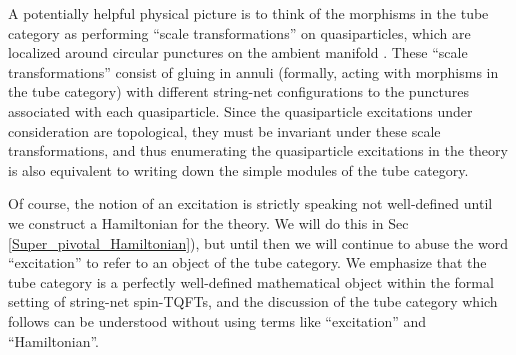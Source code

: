 \documentclass[12pt,a4paper]{article}
\newcommand{\mcc}{\mathcal{C}}
\newcommand{\ethan}[1]{{\color{amethyst}\footnotesize{(EL) #1}}}
\begin{document}
A potentially helpful physical picture is to think of the morphisms in the tube category as performing ``scale transformations'' 
on quasiparticles, which are localized around circular punctures on the ambient manifold \cite{lan2014}. 
These ``scale transformations'' consist of gluing in annuli (formally, acting with morphisms in the tube category) with different string-net configurations to the 
punctures associated with each quasiparticle. 
Since the quasiparticle excitations under consideration are topological, they must be invariant under these scale transformations, 
and thus enumerating the quasiparticle excitations in the theory is also equivalent to writing down the simple 
modules of the tube category. 

Of course, the notion of an excitation is strictly speaking not well-defined until we construct a Hamiltonian for the theory.
We will do this in Sec \ref{Super_pivotal_Hamiltonian}), but until then we will continue to abuse the word ``excitation''
to refer to an object of the tube category. 
We emphasize that the tube category is a perfectly well-defined mathematical object within 
the formal setting of string-net spin-TQFTs, and the discussion of the tube category 
which follows can be understood without using terms like ``excitation'' and ``Hamiltonian''. 




\end{document}
